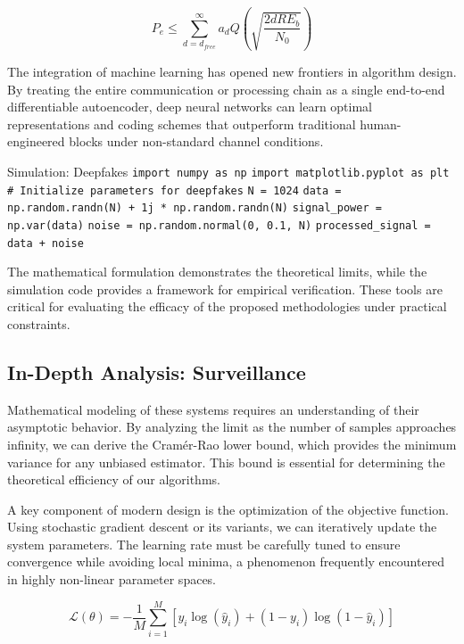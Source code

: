 \begin{equation}
    P_e \leq \sum_{d=d_{free}}^{\infty} a_d Q\left(\sqrt{\frac{2 d R E_b}{N_0}}\right)
\end{equation}

The integration of machine learning has opened new frontiers in algorithm design. By treating the entire communication or processing chain as a single end-to-end differentiable autoencoder, deep neural networks can learn optimal representations and coding schemes that outperform traditional human-engineered blocks under non-standard channel conditions.

\begin{pythonbox}{Simulation: Deepfakes}
\texttt{import numpy as np}
\texttt{import matplotlib.pyplot as plt}
\texttt{}
\texttt{\# Initialize parameters for deepfakes}
\texttt{N = 1024}
\texttt{data = np.random.randn(N) + 1j * np.random.randn(N)}
\texttt{signal\_power = np.var(data)}
\texttt{noise = np.random.normal(0, 0.1, N)}
\texttt{processed\_signal = data + noise}
\end{pythonbox}

\vspace{0.5cm}
The mathematical formulation demonstrates the theoretical limits, while the simulation code provides a framework for empirical verification. These tools are critical for evaluating the efficacy of the proposed methodologies under practical constraints.


\subsection{In-Depth Analysis: Surveillance}
Mathematical modeling of these systems requires an understanding of their asymptotic behavior. By analyzing the limit as the number of samples approaches infinity, we can derive the Cramér-Rao lower bound, which provides the minimum variance for any unbiased estimator. This bound is essential for determining the theoretical efficiency of our algorithms.

A key component of modern design is the optimization of the objective function. Using stochastic gradient descent or its variants, we can iteratively update the system parameters. The learning rate must be carefully tuned to ensure convergence while avoiding local minima, a phenomenon frequently encountered in highly non-linear parameter spaces.

\begin{equation}
    \mathcal{L}(\theta) = -\frac{1}{M} \sum_{i=1}^{M} \left[ y_i \log(\hat{y}_i) + (1-y_i)\log(1-\hat{y}_i) \right]
\end{equation}

